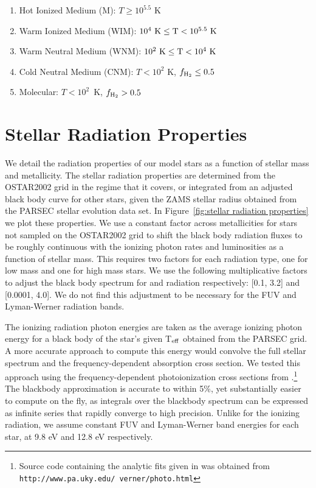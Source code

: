 \documentclass[twocolumn]{aastex61}
\begin{document}
\begin{enumerate}
\item Hot Ionized Medium (M): $T \geq 10^{5.5}$ K
\item Warm Ionized Medium (WIM): $10^{4}~\rm{K} \leq T < 10^{5.5}~\rm{K} $
\item Warm Neutral Medium (WNM): $10^{2}~\rm{K} \leq T < 10^{4}~ \rm{K}$
\item Cold Neutral Medium (CNM): $T < 10^2$ K, $f_{\rm H_2} \leq 0.5$
\item Molecular: $T < 10^2$~K, $f_{\rm H_2} > 0.5$
\end{enumerate}

\section{Stellar Radiation Properties}
\label{appendix:radiation}
We detail the radiation properties of our model stars as a function of stellar mass and metallicity. The stellar radiation properties are determined from the OSTAR2002 grid \citep{Lanz2003} in the regime that it covers, or integrated from an adjusted black body curve for other stars, given the ZAMS stellar radius obtained from the PARSEC \citep{Bressan2012,Tang2014} stellar evolution data set. In Figure~\ref{fig:stellar radiation properties} we plot these properties. We use a constant factor across metallicities for stars not sampled on the OSTAR2002 grid to shift the black body radiation fluxes to be roughly continuous with the ionizing photon rates and luminosities as a function of stellar mass. This requires two factors for each radiation type, one for low mass and one for high mass stars. We use the following multiplicative factors to adjust the black body spectrum for  and  radiation respectively: [0.1, 3.2] and [0.0001, 4.0]. We do not find this adjustment to be necessary for the FUV and Lyman-Werner radiation bands.

The ionizing radiation photon energies are taken as the average ionizing photon energy for a black body of the star's given T$_{\rm eff}$ obtained from the PARSEC grid. A more accurate approach to compute this energy would convolve the full stellar spectrum and the frequency-dependent absorption cross section. We tested this approach using the frequency-dependent photoionization cross sections from \citet{1996ApJ...465..487V}.\footnote{Source code containing the analytic fits given in \citet{1996ApJ...465..487V} was obtained from \texttt{http://www.pa.uky.edu/~verner/photo.html}} The blackbody approximation is accurate to within 5\%, yet substantially easier to compute on the fly, as integrals over the blackbody spectrum can be expressed as infinite series that rapidly converge to high precision. Unlike for the ionizing radiation, we assume constant FUV and Lyman-Werner band energies for each star, at 9.8 eV and 12.8 eV respectively.
\end{document}
